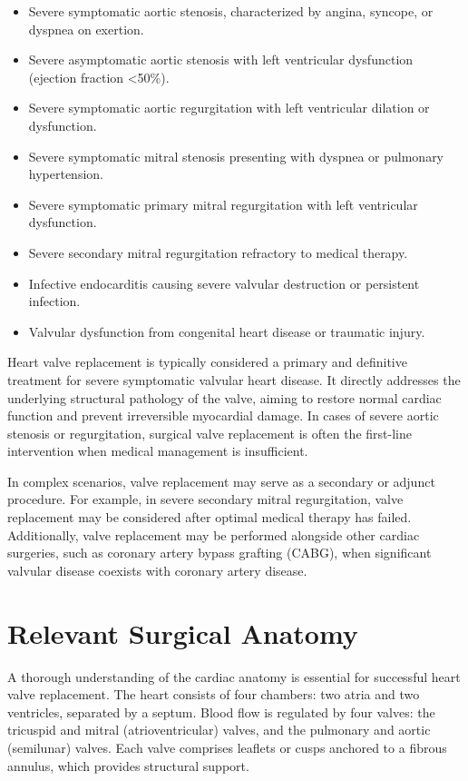 \begin{itemize}
  \item Severe symptomatic aortic stenosis, characterized by angina, syncope, or dyspnea on exertion.
  \item Severe asymptomatic aortic stenosis with left ventricular dysfunction (ejection fraction <50\%).
  \item Severe symptomatic aortic regurgitation with left ventricular dilation or dysfunction.
  \item Severe symptomatic mitral stenosis presenting with dyspnea or pulmonary hypertension.
  \item Severe symptomatic primary mitral regurgitation with left ventricular dysfunction.
  \item Severe secondary mitral regurgitation refractory to medical therapy.
  \item Infective endocarditis causing severe valvular destruction or persistent infection.
  \item Valvular dysfunction from congenital heart disease or traumatic injury.
\end{itemize}

Heart valve replacement is typically considered a primary and definitive treatment for severe symptomatic valvular heart disease. It directly addresses the underlying structural pathology of the valve, aiming to restore normal cardiac function and prevent irreversible myocardial damage. In cases of severe aortic stenosis or regurgitation, surgical valve replacement is often the first-line intervention when medical management is insufficient.

In complex scenarios, valve replacement may serve as a secondary or adjunct procedure. For example, in severe secondary mitral regurgitation, valve replacement may be considered after optimal medical therapy has failed. Additionally, valve replacement may be performed alongside other cardiac surgeries, such as coronary artery bypass grafting (CABG), when significant valvular disease coexists with coronary artery disease.

\section*{Relevant Surgical Anatomy}
A thorough understanding of the cardiac anatomy is essential for successful heart valve replacement. The heart consists of four chambers: two atria and two ventricles, separated by a septum. Blood flow is regulated by four valves: the tricuspid and mitral (atrioventricular) valves, and the pulmonary and aortic (semilunar) valves. Each valve comprises leaflets or cusps anchored to a fibrous annulus, which provides structural support. 

